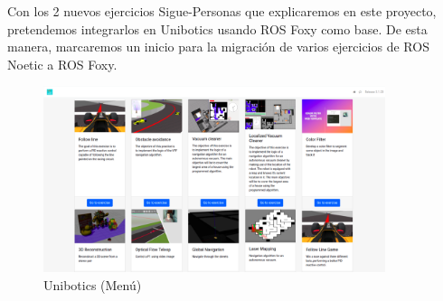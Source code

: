 Con los 2 nuevos ejercicios Sigue-Personas que explicaremos en este proyecto, pretendemos integrarlos en Unibotics usando ROS Foxy como base. De esta manera, marcaremos un inicio para la migración de varios ejercicios de ROS Noetic a ROS Foxy.\\

\begin{figure} [H]
  \begin{center}
    \includegraphics[width=10cm]{imagenes/cap1/unibotics-menu.png}
  \end{center}
  \caption[Unibotics (Menú)]{Unibotics (Menú)}
  \label{fig:menu-unibotics}
\end{figure}




